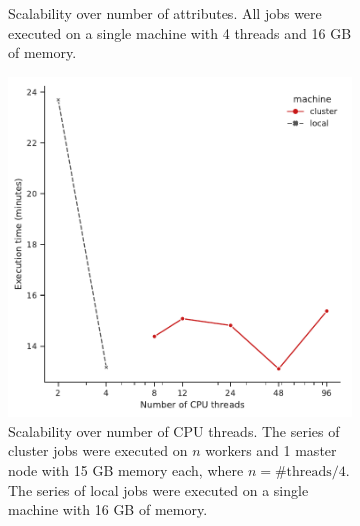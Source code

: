 \documentclass{article}
\begin{document}
\begin{figure}
\begin{subfigure}[t]{0.45\textwidth}
            \caption{Scalability over number of attributes. All jobs were executed on a single machine with 4 threads and 16 GB of memory.}
            \label{fig:plot attrs}
        \end{subfigure}
        
        \medskip
        
        \begin{subfigure}[t]{0.45\textwidth}
            \centering
            \includegraphics[width=\textwidth]{figures/plot_num_cpus.pdf}
            \caption{Scalability over number of CPU threads. The series of cluster jobs were executed on $n$ workers and 1 master node with 15 GB memory each, where $n = \text{\#threads}/4$. The series of local jobs were executed on a single machine with 16 GB of memory.}
            \label{fig:plot cpus}
        \end{subfigure}
        \hfill
        \begin{subfigure}[t]{0.45\textwidth}
            \centering

\end{subfigure}
\end{figure}
\end{document}
